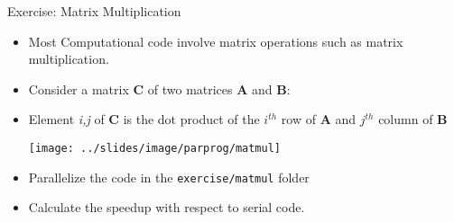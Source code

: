 \documentclass[10pt,t]{beamer}
\begin{document}
\begin{frame}{Exercise: Matrix Multiplication}
  \begin{itemize}
    \item Most Computational code involve matrix operations such as matrix multiplication.
    \item Consider a matrix {\bf C} of two matrices {\bf A} and {\bf B}:
    \item[] Element {\it i,j} of {\bf C} is the dot product of the $i^{th}$ row of {\bf A} and $j^{th}$ column of {\bf B}
      \begin{center}
        \texttt{[image: ../slides/image/parprog/matmul]}
      \end{center}
    \item Parallelize the code in the \texttt{exercise/matmul} folder
    \item Calculate the speedup with respect to serial code.
  \end{itemize}
%      
%      
\end{frame}
\end{document}

